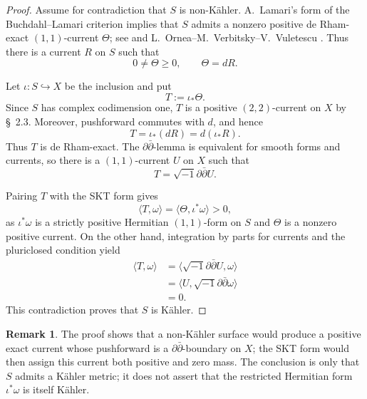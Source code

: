 \documentclass[11pt]{amsart}
\numberwithin{equation}{section}
\theoremstyle{plain}
\theoremstyle{definition}
\newtheorem{rem}[thm]{Remark}
\begin{document}
\begin{proof}
Assume for contradiction that $S$ is non-K\"ahler.  A.~Lamari's form of the
Buchdahl--Lamari criterion implies that $S$ admits a nonzero positive
de Rham-exact $(1,1)$-current $\Theta$; see \cite[Theorem 6.1]{La99} and
L.~Ornea--M.~Verbitsky--V.~Vuletescu \cite[Theorem 1.3]{OVV21}.  Thus there
is a current $R$ on $S$ such that
\[
 0\neq\Theta\geq0,
 \qquad
 \Theta=dR.
\]

Let $\iota:S\hookrightarrow X$ be the inclusion and put
\[
 T:=\iota_*\Theta.
\]
Since $S$ has complex codimension one, $T$ is a positive $(2,2)$-current on $X$ by \S\ 2.3.
Moreover, pushforward commutes with $d$, and hence
\[
 T=\iota_*(dR)=d(\iota_*R).
\]
Thus $T$ is de Rham-exact.  The $\partial\bar\partial$-lemma is equivalent
for smooth forms and currents, so there is a $(1,1)$-current $U$ on $X$ such
that
\[
 T=\sqrt{-1}\partial\bar\partial U.
\]

Pairing $T$ with the SKT form gives
\[
 \langle T,\omega\rangle
 =\langle\Theta,\iota^*\omega\rangle>0,
\]
as $\iota^*\omega$ is a strictly positive Hermitian $(1,1)$-form on
$S$ and $\Theta$ is a nonzero positive current.  On the other hand,
integration by parts for currents and the pluriclosed condition yield
\[
\begin{aligned}
 \langle T,\omega\rangle
 &=\langle \sqrt{-1}\partial\bar\partial U,\omega\rangle\\
 &=\langle U,\sqrt{-1}\partial\bar\partial\omega\rangle\\
 &=0.
\end{aligned}
\]
This contradiction proves that $S$ is K\"ahler.
\end{proof}


\begin{rem}\label{skt-surface-remark}
The proof shows that a non-K\"ahler surface would produce a positive exact
current whose pushforward is a $\partial\bar\partial$-boundary on $X$; the
SKT form would then assign this current both positive and zero mass.  The
conclusion is only that $S$ admits a K\"ahler metric; it does not assert that
the restricted Hermitian form $\iota^*\omega$ is itself K\"ahler.
\end{rem}
\end{document}

